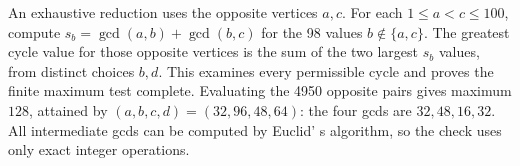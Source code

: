 An exhaustive reduction uses the opposite vertices $a,c$. For each $1\le a<c\le100$, compute $s_b=\gcd(a,b)+\gcd(b,c)$ for the 98 values $b\notin\{a,c\}$. The greatest cycle value for those opposite vertices is the sum of the two largest $s_b$ values, from distinct choices $b,d$. This examines every permissible cycle and proves the finite maximum test complete. Evaluating the 4950 opposite pairs gives maximum $\boxed{128}$, attained by $(a,b,c,d)=(32,96,48,64)$: the four gcds are $32,48,16,32$. All intermediate gcds can be computed by Euclid' s algorithm, so the check uses only exact integer operations.
